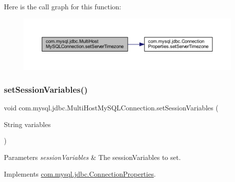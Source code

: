 Here is the call graph for this function\+:
\nopagebreak
\begin{figure}[H]
\begin{center}
\leavevmode
\includegraphics[width=350pt]{classcom_1_1mysql_1_1jdbc_1_1_multi_host_my_s_q_l_connection_a49872e46bc69088b63f84767c386e811_cgraph}
\end{center}
\end{figure}
\mbox{\label{classcom_1_1mysql_1_1jdbc_1_1_multi_host_my_s_q_l_connection_ad1406aa3ec3a0b76716744c9be734d7f}} 
\subsubsection{\texorpdfstring{set\+Session\+Variables()}{setSessionVariables()}}
{\footnotesize\ttfamily void com.\+mysql.\+jdbc.\+Multi\+Host\+My\+S\+Q\+L\+Connection.\+set\+Session\+Variables (\begin{DoxyParamCaption}\item[{String}]{variables }\end{DoxyParamCaption})}


\begin{DoxyParams}{Parameters}
{\em session\+Variables} & The session\+Variables to set. \\
\hline
\end{DoxyParams}


Implements \mbox{\hyperlink{interfacecom_1_1mysql_1_1jdbc_1_1_connection_properties_a9883494dfd2b4b2ed6905ecc13cc167d}{com.\+mysql.\+jdbc.\+Connection\+Properties}}.

